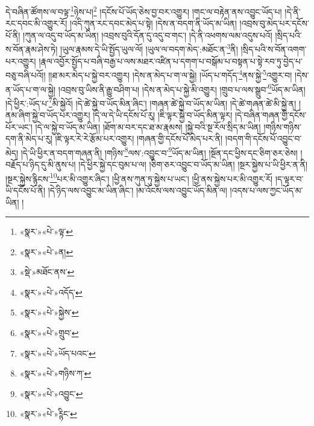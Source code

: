 དེ་བཞིན་ཚོགས་ལ་བལྟ་\footnote{«སྣར་»«པེ་»ལྟ་}ཉེས་པ།\footnote{«སྣར་»«པེ་»ན།} །དངོས་པོ་ཡོད་ཅེས་བྱ་བར་འགྱུར། །གང་ལ་བརྟེན་ནས་འབྱུང་ཡོད་པ། །དེ་ནི་རང་དབང་མི་འགྱུར་རོ། །འདི་ཀུན་རང་དབང་མེད་པ་སྟེ། །དེས་ན་བདག་ནི་ཡོད་མ་ཡིན། །འབྲས་བུ་མེད་པར་དངོས་པོ་ནི། །ཀུན་ལ་འདུ་བ་ཡོད་མ་ཡིན། །འབྲས་བུའི་དོན་དུ་འདུ་བ་གང་། །དེ་ནི་འཕགས་ལམ་འདུས་པའོ། །སྲིད་པའི་ས་བོན་རྣམ་ཤེས་ཏེ། །ཡུལ་རྣམས་དེ་ཡི་སྤྱོད་ཡུལ་ལོ། །ཡུལ་ལ་བདག་མེད་:མཐོང་ན་\footnote{«སྡེ་»མཐོང་ནས་}ནི། །སྲིད་པའི་ས་བོན་འགག་པར་འགྱུར། །རྣལ་འབྱོར་སྤྱོད་པ་བཞི་བརྒྱ་པ་ལས་མཐར་འཛིན་པ་དགག་པ་བསྒོམ་པ་བསྟན་པ་སྟེ་རབ་ཏུ་བྱེད་པ་བཅུ་བཞི་པའོ།། །།ཐ་མར་མེད་པ་སྐྱེ་བར་འགྱུར། །དེས་ན་མེད་པ་ག་ལ་སྐྱེ། །ཡོད་པ་གདོད་\footnote{«སྣར་»«པེ་»འདོད་}ནས་སྐྱེ་\footnote{«སྣར་»«པེ་»སྐྱེས་}འགྱུར་བ། །དེས་ན་ཡོད་པ་ག་ལ་སྐྱེ། །འབྲས་བུ་ཡིས་ནི་རྒྱུ་བཤིག་པ། །དེས་ན་མེད་པ་སྐྱེ་མི་འགྱུར། །གྲུབ་པ་ལས་སྒྲུབ་\footnote{«སྣར་»«པེ་»གྲུབ་}ཡོད་མ་ཡིན། །དེ་ཕྱིར་:ཡོད་པ་\footnote{«སྣར་»«པེ་»ཡོད་པའང་}མི་སྐྱེའོ། །དེ་ཚེ་སྐྱེ་བ་ཡོད་མིན་ཞིང་། །གཞན་ཚེ་སྐྱེ་བ་ཡོད་མ་ཡིན། །དེ་ཚེ་གཞན་ཚེ་མི་སྐྱེ་ན། །ནམ་ཞིག་སྐྱེ་བ་ཡོད་པར་འགྱུར། །དེ་ལ་དེ་ཡི་དངོས་པོ་རུ། །ཇི་ལྟར་སྐྱེ་བ་ཡོད་མིན་ལྟར། །དེ་བཞིན་གཞན་གྱི་དངོས་པོར་ཡང་། །དེ་ལ་སྐྱེ་བ་ཡོད་མ་ཡིན། །ཐོག་མ་བར་དང་ཐ་མ་རྣམས། །སྐྱེ་བའི་སྔ་རོལ་སྲིད་མ་ཡིན། །གཉིས་གཉིས་དག་ནི་མེད་པ་རུ། །ཇི་ལྟར་རེ་རེ་རྩོམ་པར་འགྱུར། །གཞན་གྱི་དངོས་པོ་མེད་པར་ནི། །བདག་གི་དངོས་པོ་འབྱུང་བ་མེད། །དེ་ཡི་ཕྱིར་ན་བདག་གཞན་ནི། །གཉིས་\footnote{«སྣར་»«པེ་»གཉིས་ཀ་}ལས་:འབྱུང་བ་\footnote{«སྣར་»«པེ་»འབྱུང་}ཡོད་མ་ཡིན། །སྔོན་དང་ཕྱིས་དང་ཅིག་ཅར་ཅེས། །བརྗོད་པ་ཉིད་དུ་མི་ནུས་པ། །དེ་ཕྱིར་སྐྱེ་དང་བུམ་པ་ལ། །ཅིག་ཅར་འབྱུང་བ་ཡོད་མ་ཡིན། །སྔར་སྐྱེས་པ་ཡི་ཕྱིར་ན་ནི། །སྔར་སྐྱེས་རྙིངས་\footnote{«སྣར་»«པེ་»ཪྙིང་}པར་མི་འགྱུར་ཞིང་། །ཕྱི་ནས་ཀུན་ཏུ་སྐྱེས་པ་ཡང་། །ཕྱི་ནས་སྐྱེས་པར་མི་འགྱུར་རོ། །ད་ལྟར་བ་ཡི་དངོས་པོ་ནི། །དེ་ཉིད་ལས་འབྱུང་མ་ཡིན་ཞིང་། །མ་འོངས་ལས་འབྱུང་ཡོད་མིན་ལ། །འདས་པ་ལས་ཀྱང་ཡོད་མ་ཡིན། །
